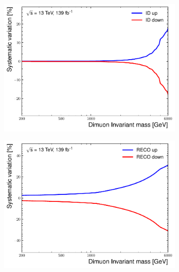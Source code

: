 \begin{figure}[]
\begin{subfigure}[b]{0.42\textwidth}
        \centering
        \includegraphics[width=\textwidth]{figures/analysis/datamc/Uncertainties/exp/mm/m_uu_pstOR_MUON_ID__1up.pdf}
        \label{fig:uncert:mmID}
    \end{subfigure}
    \begin{subfigure}[b]{0.42\textwidth}
        \centering
        \includegraphics[width=\textwidth]{figures/analysis/datamc/Uncertainties/exp/mm/m_uu_pstOR_MUON_EFF_RECO_SYS__1up.pdf}

\end{subfigure}
\end{figure}
